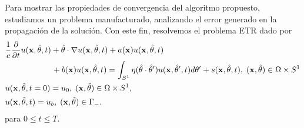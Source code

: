 Para mostrar las propiedades de convergencia del algoritmo propuesto,
estudiamos un problema manufacturado, analizando el error generado en la propagación de 
la solución.
Con este fin, resolvemos el problema ETR dado por 
\begin{equation*}
\begin{split}
\begin{aligned}
&\frac{1}{c}\frac{\partial }{\partial t}u(\mathbf{x},\hat{\theta},t) + \hat{\theta} \cdot \nabla u(\mathbf{x},\hat{\theta},t)+a(\mathbf{x})u(\mathbf{x},\hat{\theta},t)  \\
&\quad \quad \quad  \quad \quad \; \;\,  +b(\mathbf{x})u(\mathbf{x},\hat{\theta},t) = \int_{S^1}\eta(\hat{\theta}\cdot\hat{\theta} ') 
u(\mathbf{x},\hat \theta',t) d\theta'+s(\mathbf{x},\hat{\theta},t),  \; (\mathbf{x},\hat{\theta})  \in \Omega\times S^1\\
&u(\mathbf{x},\hat{\theta},t=0)=u_0, \; (\mathbf{x},\hat{\theta})  \in \Omega\times S^1,  \\
&u(\mathbf{x},\hat{\theta},t)=u_b, \; (\mathbf{x},\hat{\theta}) \in \Gamma_-. \notag
\end{aligned}
\end{split}
\label{eq:RTEdisp}
\end{equation*}
para $0\leq t \leq T$. 

